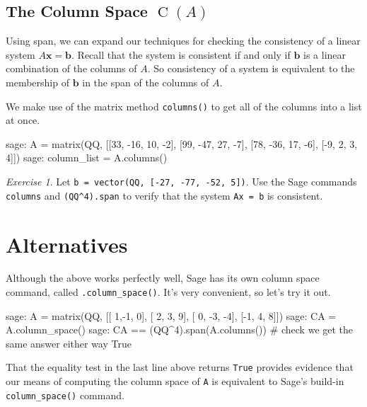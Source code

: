 \documentclass[fleqn,11pt]{paper}
\theoremstyle{remark}
\newtheorem{exercise}{Exercise}
\renewcommand{\vec}[1]{\mathbf{#1}}
\newcommand{\<}{\ensuremath{\langle}}
\renewcommand{\>}{\ensuremath{\rangle}}
\newcommand\vb{\vec{b}}
\newcommand\vx{\vec{x}}
\begin{document}
\subsection{The Column Space $\operatorname{C}(A)$}
Using span, we can expand our techniques for checking the consistency
of a linear system $A\vx = \vb$. Recall that the system is consistent if and only if 
$\vb$ is a linear combination of the columns of $A$.
So consistency of a system is equivalent to the membership of $\vb$
in the span of the columns of $A$.

We make use of the matrix method {\tt columns()} to get all of the columns into a list at once.
\begin{sageblock}
    sage: A = matrix(QQ, [[33, -16, 10, -2],
                          [99, -47, 27, -7],
                          [78, -36, 17, -6],
                          [-9,   2,  3,  4]])
    sage: column_list = A.columns()
\end{sageblock}

\vskip4mm
\begin{exercise}
Let {\tt b = vector(QQ, [-27, -77, -52, 5])}.
Use the Sage commands {\tt columns} and {\tt (QQ\^{}4).span} to verify that
the system {\tt Ax = b} is consistent.
\vskip4mm
\end{exercise}
\newpage
\section*{Alternatives}
Although the above works perfectly well, Sage has its own column space command,
called {\tt .column\_space()}.  It's very convenient, so let's try it out.
\begin{sageblock}
    sage: A = matrix(QQ, [[ 1,-1, 0],
                          [ 2, 3, 9],
                          [ 0, -3, -4],
                          [-1, 4, 8]])
    sage: CA = A.column_space()
    sage: CA == (QQ^4).span(A.columns())  # check we get the same answer either way
      True
\end{sageblock}
That the equality test in the last line above returns {\tt True} provides evidence 
that our means of computing the column space of {\tt A} is equivalent to
Sage's build-in {\tt column\_space()} command.
\end{document}
